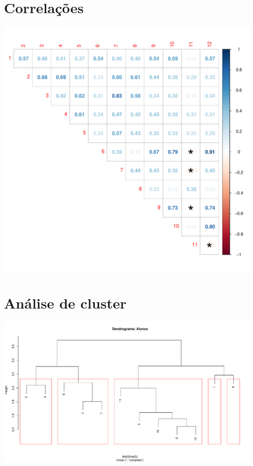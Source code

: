 \documentclass[
  landscape]{article}
\begin{document}
\hypertarget{correlauxe7uxf5es}{%
\section{Correlações}\label{correlauxe7uxf5es}}

\begin{center}\includegraphics{analise_avaliacao_files/figure-latex/unnamed-chunk-2-1} \end{center}

\hypertarget{anuxe1lise-de-cluster}{%
\section{Análise de cluster}\label{anuxe1lise-de-cluster}}

\begin{center}\includegraphics{analise_avaliacao_files/figure-latex/unnamed-chunk-3-1} \end{center}
\end{document}
